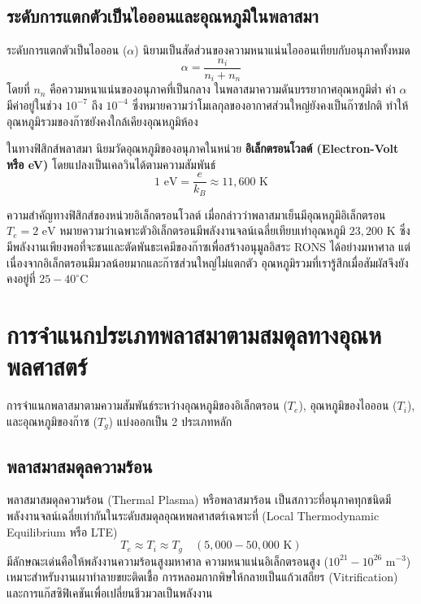 \subsection{ระดับการแตกตัวเป็นไอออนและอุณหภูมิในพลาสมา}

ระดับการแตกตัวเป็นไอออน ($\alpha$) นิยามเป็นสัดส่วนของความหนาแน่นไอออนเทียบกับอนุภาคทั้งหมด
\begin{equation}
    \alpha = \frac{n_i}{n_i + n_n}
\end{equation}
โดยที่ $n_n$ คือความหนาแน่นของอนุภาคที่เป็นกลาง ในพลาสมาความดันบรรยากาศอุณหภูมิต่ำ ค่า $\alpha$ มีค่าอยู่ในช่วง $10^{-7}$ ถึง $10^{-4}$ ซึ่งหมายความว่าโมเลกุลของอากาศส่วนใหญ่ยังคงเป็นก๊าซปกติ ทำให้อุณหภูมิรวมของก๊าซยังคงใกล้เคียงอุณหภูมิห้อง

ในทางฟิสิกส์พลาสมา นิยมวัดอุณหภูมิของอนุภาคในหน่วย \textbf{อิเล็กตรอนโวลต์ (Electron-Volt หรือ eV)} โดยแปลงเป็นเคลวินได้ตามความสัมพันธ์
\begin{equation}
    1\text{ eV} = \frac{e}{k_B} \approx 11,600\text{ K}
\end{equation}

\begin{focusbox}{ความสำคัญทางฟิสิกส์ของหน่วยอิเล็กตรอนโวลต์}
เมื่อกล่าวว่าพลาสมาเย็นมีอุณหภูมิอิเล็กตรอน $T_e = 2\text{ eV}$ หมายความว่าเฉพาะตัวอิเล็กตรอนมีพลังงานจลน์เฉลี่ยเทียบเท่าอุณหภูมิ $23,200\text{ K}$ ซึ่งมีพลังงานเพียงพอที่จะชนและตัดพันธะเคมีของก๊าซเพื่อสร้างอนุมูลอิสระ RONS ได้อย่างมหาศาล แต่เนื่องจากอิเล็กตรอนมีมวลน้อยมากและก๊าซส่วนใหญ่ไม่แตกตัว อุณหภูมิรวมที่เรารู้สึกเมื่อสัมผัสจึงยังคงอยู่ที่ $25 - 40^\circ\text{C}$
\end{focusbox}

\section{การจำแนกประเภทพลาสมาตามสมดุลทางอุณหพลศาสตร์}

การจำแนกพลาสมาตามความสัมพันธ์ระหว่างอุณหภูมิของอิเล็กตรอน ($T_e$), อุณหภูมิของไอออน ($T_i$), และอุณหภูมิของก๊าซ ($T_g$) แบ่งออกเป็น 2 ประเภทหลัก

\subsection{พลาสมาสมดุลความร้อน}

พลาสมาสมดุลความร้อน (Thermal Plasma) หรือพลาสมาร้อน เป็นสภาวะที่อนุภาคทุกชนิดมีพลังงานจลน์เฉลี่ยเท่ากันในระดับสมดุลอุณหพลศาสตร์เฉพาะที่ (Local Thermodynamic Equilibrium หรือ LTE)
\begin{equation}
    T_e \approx T_i \approx T_g \quad (5,000 - 50,000\text{ K})
\end{equation}
มีลักษณะเด่นคือให้พลังงานความร้อนสูงมหาศาล ความหนาแน่นอิเล็กตรอนสูง ($10^{21} - 10^{26}\text{ m}^{-3}$) เหมาะสำหรับงานเผาทำลายขยะติดเชื้อ การหลอมกากพิษให้กลายเป็นแก้วเสถียร (Vitrification) และการแก๊สซิฟิเคชันเพื่อเปลี่ยนชีวมวลเป็นพลังงาน

